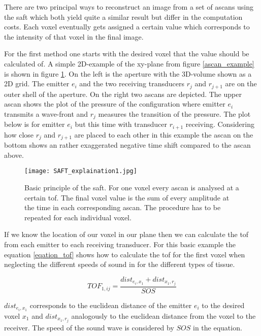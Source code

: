 There are two principal ways to reconstruct an image from a set of \acp{ascan} using the \ac{saft} which both yield quite a similar result but differ in the computation costs. Each voxel eventually gets assigned a certain value which corresponds to the intensity of that voxel in the final image. 

\bigskip

For the first method one starts with the desired voxel that the value should be calculated of.
A simple 2D-example of the xy-plane from figure \ref{ascan_example} is shown in figure \ref{SAFT_explain1}. On the left is the aperture with the 3D-volume shown as a 2D grid. The emitter $e_i$ and the two receiving transducers $r_j$ and $r_{j+1}$ are on the outer shell of the aperture. On the right two \acp{ascan} are depicted. The upper \ac{ascan} shows the plot of the pressure of the configuration where emitter $e_i$ transmits a wave-front and $r_j$ measures the transition of the pressure. The plot below is for emitter $e_i$ but this time with transducer $r_{i+1}$ receiving. Considering how close $r_j$ and $r_{j+1}$ are placed to each other in this example the \ac{ascan} on the bottom shows an rather exaggerated negative time shift compared to the \ac{ascan} above.

\begin{figure}[H]
    \centering
    \texttt{[image: SAFT\_explaination1.jpg]}
    \caption{Basic principle of the \ac{saft}. For one voxel every \ac{ascan} is analysed at a certain \ac{tof}. The final voxel value is the sum of every amplitude at the time in each corresponding \ac{ascan}. The procedure has to be repeated for each individual voxel. }
    \label{SAFT_explain1}
\end{figure}


If we know the location of our voxel in our plane then we can calculate the \ac{tof} from each emitter to each receiving transducer. For this basic example the equation \ref{eqation_tof} shows how to calculate the \ac{tof} for the first voxel when neglecting the different speeds of sound in for the different types of tissue.

\begin{equation}
TOF_{1,ij} =  \frac{dist_{e_i,x_1} + dist_{x_1,r_{j}} }{ SOS } 
\label{eqation_tof}
\end{equation}

$dist_{e_i,x_1}$ corresponds to the euclidean distance of the emitter $e_i$ to the desired voxel $x_1$ and $dist_{x_1,r_{j}}$ analogously to the euclidean distance from the voxel to the receiver.
The speed of the sound wave is considered by $SOS$ in the equation.

